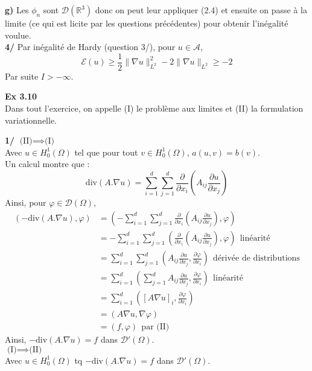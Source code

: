 \documentclass[a4paper,12pt]{article}
\newcommand{\Ho}{H^1_0(\Omega)}
\begin{document}
\textbf{g)} Les $\phi_n$ sont $\mathcal{D}(\mathbb{R}^3)$ donc on peut leur appliquer (2.4) et ensuite on passe à la limite (ce qui est licite par les questions précédentes) pour obtenir l'inégalité voulue. \\

\textbf{4/} Par inégalité de Hardy (question 3/), pour $u \in \mathcal{A}$,
$$\mathcal{E}(u) \geq \frac{1}{2} \| \nabla u \|_{L^2}^2 - 2 \| \nabla u \|_{L^2} \geq -2$$
Par suite $\boxed{I > - \infty}$.

\textbf{Ex 3.10} \\
Dans tout l'exercice, on appelle (I) le problème aux limites et (II) la formulation variationnelle. 

\textbf{1/} $\boxed{\text{(II)} \implies \text{(I)}}$ \\
Avec $u \in \Ho$ tel que pour tout $v \in \Ho$, $a(u,v)=b(v)$. \\

Un calcul montre que :
$$\boxed{\text{div}(A.\nabla u) = \sum_{i=1}^d \sum_{j=1}^d \frac{\partial}{\partial x_i} \left(A_{ij} \frac{\partial u}{\partial x_j} \right)}$$
Ainsi, pour $\varphi \in \mathcal{D}(\Omega)$, 
\begin{align*}
(- \text{div}(A.\nabla u), \varphi) & = \left(- \sum_{i=1}^d \sum_{j=1}^d \frac{\partial}{\partial x_i} \left(A_{ij} \frac{\partial u}{\partial x_j} \right), \varphi \right) \\
& = - \sum_{i=1}^d \sum_{j=1}^d \left( \frac{\partial}{\partial x_i} \left( A_{ij} \frac{\partial u}{\partial x_j} \right), \varphi \right) \ \ \text{linéarité} \\
& = \sum_{i=1}^d \sum_{j=1}^d \left(A_{ij} \frac{\partial u}{\partial x_j}, \frac{\partial \varphi}{\partial x_i} \right) \ \ \text{dérivée de distributions} \\
& = \sum_{i=1}^d \left(\sum_{j=1}^d A_{ij} \frac{\partial u}{\partial x_j}, \frac{\partial \varphi}{\partial x_i} \right) \ \ \text{linéarité} \\
& = \sum_{i=1}^d \left([A \nabla u]_i, \frac{\partial \varphi}{\partial x_i} \right) \\
& = (A \nabla u, \nabla \varphi) \\
& = (f, \varphi) \ \ \text{par (II)}
\end{align*}
Ainsi, $\boxed{-\text{div}(A. \nabla u) = f}$ dans $\mathcal{D}'(\Omega)$. \\

$\boxed{\text{(I)} \implies \text{(II)}}$ \\
Avec $u \in H^1_0(\Omega)$ tq $-\text{div}(A. \nabla u) = f$ dans $\mathcal{D}'(\Omega)$. \\
\end{document}
